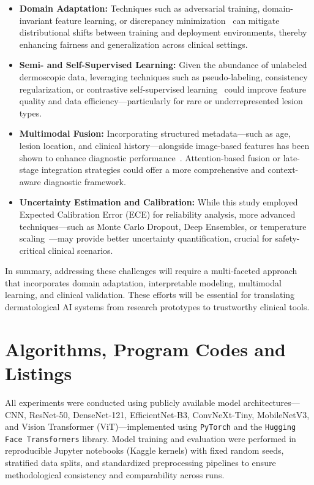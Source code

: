 \documentclass[pdflatex,sn-mathphys-num]{sn-jnl}%
\theoremstyle{thmstyleone}%
\theoremstyle{thmstyletwo}%
\theoremstyle{thmstylethree}%
\begin{document}
\begin{itemize}
    \item \textbf{Domain Adaptation:} Techniques such as adversarial training, domain-invariant feature learning, or discrepancy minimization~\cite{guan2021domain} can mitigate distributional shifts between training and deployment environments, thereby enhancing fairness and generalization across clinical settings.

    \item \textbf{Semi- and Self-Supervised Learning:} Given the abundance of unlabeled dermoscopic data, leveraging techniques such as pseudo-labeling, consistency regularization, or contrastive self-supervised learning~\cite{jiao2024learning} could improve feature quality and data efficiency—particularly for rare or underrepresented lesion types.

    \item \textbf{Multimodal Fusion:} Incorporating structured metadata—such as age, lesion location, and clinical history—alongside image-based features has been shown to enhance diagnostic performance~\cite{li2024review}. Attention-based fusion or late-stage integration strategies could offer a more comprehensive and context-aware diagnostic framework.

    \item \textbf{Uncertainty Estimation and Calibration:} While this study employed Expected Calibration Error (ECE) for reliability analysis, more advanced techniques—such as Monte Carlo Dropout, Deep Ensembles, or temperature scaling~\cite{lakshminarayanan2017simple}—may provide better uncertainty quantification, crucial for safety-critical clinical scenarios.
\end{itemize}

In summary, addressing these challenges will require a multi-faceted approach that incorporates domain adaptation, interpretable modeling, multimodal learning, and clinical validation. These efforts will be essential for translating dermatological AI systems from research prototypes to trustworthy clinical tools.

\section{Algorithms, Program Codes and Listings}\label{sec8}

All experiments were conducted using publicly available model architectures—CNN, ResNet-50, DenseNet-121, EfficientNet-B3, ConvNeXt-Tiny, MobileNetV3, and Vision Transformer (ViT)—implemented using \texttt{PyTorch} and the \texttt{Hugging Face Transformers} library. Model training and evaluation were performed in reproducible Jupyter notebooks (Kaggle kernels) with fixed random seeds, stratified data splits, and standardized preprocessing pipelines to ensure methodological consistency and comparability across runs.
\end{document}
